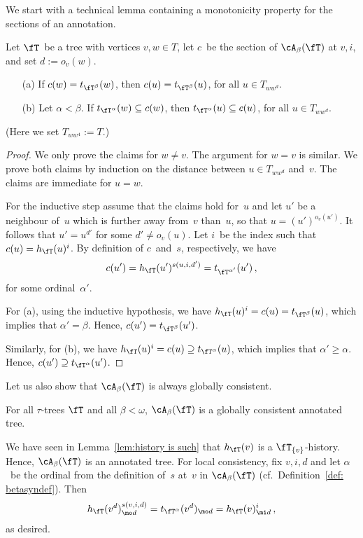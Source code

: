 \documentclass{LMCS}
\begin{document}
We start with a technical lemma containing a monotonicity property
for the sections of an annotation.
\begin{lem}\label{lem:sections monotone}
Let $\fT$~be a tree with vertices $v,w \in T$,
let $c$~be the section of $\cA_\beta(\fT)$ at $v,i$,
and set $d := o_v(w)$.
\begin{enumerate}
\item[\normalfont(a)] If $c(w) = t_{\fT^\beta}(w)$,
  then $c(u) = t_{\fT^\beta}(u)$, for all $u \in T_{ww^d}$.
\item[\normalfont(b)] Let $\alpha < \beta$. If $t_{\fT^\alpha}(w) \subseteq c(w)$, then
  $t_{\fT^\alpha}(u) \subseteq c(u)$, for all $u \in T_{ww^d}$.
\end{enumerate}
(Here we set $T_{ww^4} := T$.)
\end{lem}
\begin{proof}
We only prove the claims for $w \neq v$. The argument for $w = v$ is similar.
We prove both claims by induction on the distance between $u \in T_{ww^d}$
and~$v$. The claims are immediate for $u=w$.

For the inductive step assume that the claims hold for~$u$
and let $u'$ be a neighbour of~$u$ which is further away from~$v$ than~$u$,
so that $u = (u')^{o_v(u')}$.
It follows that $u'=u^{d'}$ for some $d' \neq o_v(u)$.
Let $i$~be the index such that $c(u) = h_\fT(u)^i$.
By definition of $c$~and~$s$, respectively, we have
\begin{align*}
  c(u') = h_{\fT}(u')^{s(u,i,d')} = t_{\fT^{\alpha'}}(u')\,,
\end{align*}
for some ordinal~$\alpha'$.

For (a), using the inductive hypothesis,
we have $h_\fT(u)^i = c(u) = t_{\fT^\beta}(u)$,
which implies that $\alpha' = \beta$.
Hence, $c(u') = t_{\fT^\beta}(u')$.

Similarly, for (b), we have $h_\fT(u)^i = c(u) \supseteq t_{\fT^\alpha}(u)$,
which implies that $\alpha' \geq \alpha$.
Hence, $c(u') \supseteq t_{\fT^\alpha}(u')$.
\end{proof}

Let us also show that $\cA_\beta(\fT)$ is always globally consistent.
\begin{lem}\label{lem:annotated tree is such}
For all $\tau$-trees $\fT$ and all $\beta<\omega$,
$\cA_\beta(\fT)$ is a globally consistent annotated tree.
\end{lem}

\proof
We have seen in Lemma~\ref{lem:history is such} that $h_\fT(v)$ is a
$\fT_{\{v\}}$-history.
Hence, $\cA_\beta(\fT)$ is an annotated tree.
For local consistency, fix $v,i,d$ and let $\alpha$~be the ordinal
from the definition of~$s$
at~$v$ in $\cA_\beta(\fT)$ (cf.~Definition~\ref{def: betasyndef}).
Then
\begin{align*}
  h_\fT(v^d)^{s(v,i,d)}_{\mo d} = t_{\fT^\alpha}(v^d)_{\mo d} = h_\fT(v)^i_{\mi d}\,,
\end{align*}
as desired.
\end{document}
